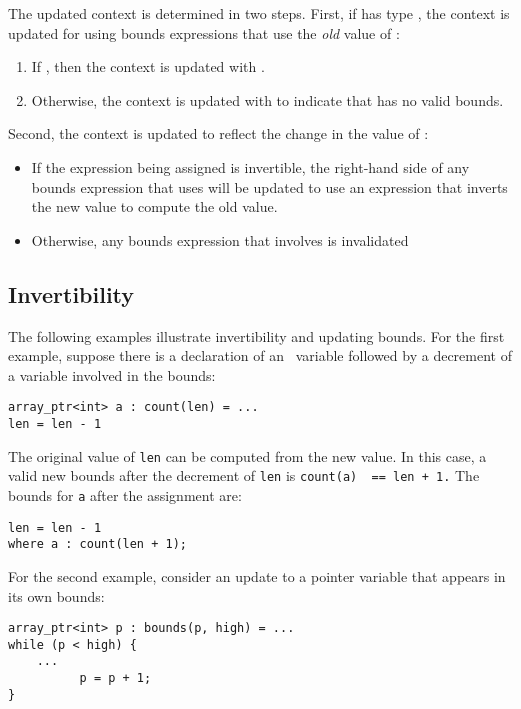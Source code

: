 The updated context is determined in two steps. First, if
 has type \arrayptr, the context is updated for
 using bounds expressions that use the \emph{old} value of :

\begin{enumerate}
\item
  If , then the context is updated with
  .
\item
  Otherwise, the context is updated with 
   to indicate that  has no valid bounds.
\end{enumerate}

Second, the context is updated to reflect the change in the value of
:

\begin{itemize}
\item
  If the expression being assigned is invertible, the right-hand side of
  any bounds expression that uses  will be updated to use an
  expression that inverts the new value to compute the old value.
\item
  Otherwise, any bounds expression that involves  is invalidated
\end{itemize}

\subsection{Invertibility}

The following examples illustrate invertibility and updating bounds. For
the first example, suppose there is a declaration of an
\arrayptr\ variable followed by a decrement of a variable
involved in the bounds:

\begin{lstlisting}
array_ptr<int> a : count(len) = ...
len = len - 1
\end{lstlisting}

The original value of \lstinline|len| can be computed from the new value.
In this case, a valid new bounds after the decrement of \lstinline|len| is
\lstinline|count(a)  == len + 1.| The bounds for \lstinline|a| after the
assignment are:
\begin{lstlisting}
len = len - 1
where a : count(len + 1);
\end{lstlisting}

For the second example, consider an update to a pointer variable that
appears in its own bounds:
\begin{lstlisting}
array_ptr<int> p : bounds(p, high) = ...         
while (p < high) {
    ...
          p = p + 1;
}
\end{lstlisting}

